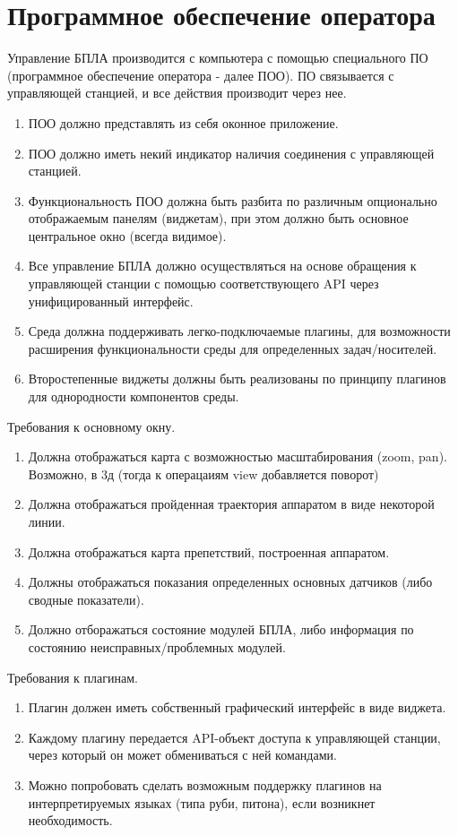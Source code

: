 \documentclass[utf8]{report}
\begin{document}
\section{Программное обеспечение оператора}

Управление БПЛА производится с компьютера с помощью специального ПО (программное обеспечение оператора - далее ПОО). ПО связывается с управляющей станцией, и все действия производит через нее.

\begin{enumerate}
  \item ПОО должно представлять из себя оконное приложение.
  \item ПОО должно иметь некий индикатор наличия соединения с управляющей станцией.
  \item Функциональность ПОО должна быть разбита по различным опционально отображаемым панелям (виджетам), при этом должно быть основное центральное окно (всегда видимое).
  \item Все управление БПЛА должно осуществляться на основе обращения к управляющей станции с помощью соответствующего API через унифицированный интерфейс.
  \item Среда должна поддерживать легко-подключаемые плагины, для возможности расширения функциональности среды для определенных задач/носителей.
  \item Второстепенные виджеты должны быть реализованы по принципу плагинов для однородности компонентов среды.
\end{enumerate}

Требования к основному окну.

\begin{enumerate}
  \item Должна отображаться карта с возможностью масштабирования (zoom, pan). Возможно, в 3д (тогда к операцаиям view добавляется поворот)
  \item Должна отображаться пройденная траектория аппаратом в виде некоторой линии.
  \item Должна отображаться карта препетствий, построенная аппаратом.
  \item Должны отображаться показания определенных основных датчиков (либо сводные показатели).
  \item Должно отборажаться состояние модулей БПЛА, либо информация по состоянию неисправных/проблемных модулей.
\end{enumerate}

Требования к плагинам.

\begin{enumerate}
  \item Плагин должен иметь собственный графический интерфейс в виде виджета.
  \item Каждому плагину передается API-объект доступа к управляющей станции, через который он может обмениваться с ней командами.
  \item Можно попробовать сделать возможным поддержку плагинов на интерпретируемых языках (типа руби, питона), если возникнет необходимость.
\end{enumerate}
\end{document}
